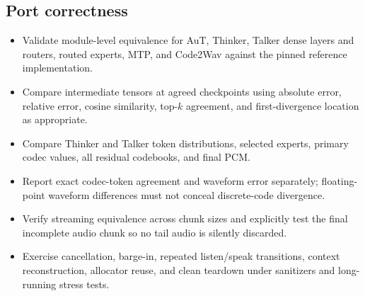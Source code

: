 \documentclass[10pt,letterpaper]{article}
\begin{document}
\subsection{Port correctness}
\begin{itemize}
    \item Validate module-level equivalence for AuT, Thinker, Talker dense layers and routers, routed experts, MTP, and Code2Wav against the pinned reference implementation.
    \item Compare intermediate tensors at agreed checkpoints using absolute error, relative error, cosine similarity, top-$k$ agreement, and first-divergence location as appropriate.
    \item Compare Thinker and Talker token distributions, selected experts, primary codec values, all residual codebooks, and final PCM.
    \item Report exact codec-token agreement and waveform error separately; floating-point waveform differences must not conceal discrete-code divergence.
    \item Verify streaming equivalence across chunk sizes and explicitly test the final incomplete audio chunk so no tail audio is silently discarded.
    \item Exercise cancellation, barge-in, repeated listen/speak transitions, context reconstruction, allocator reuse, and clean teardown under sanitizers and long-running stress tests.
\end{itemize}
\end{document}
